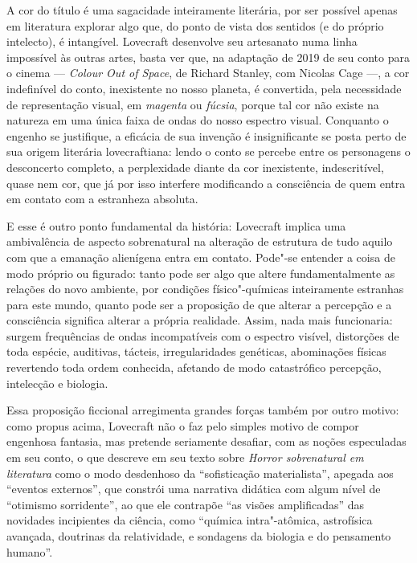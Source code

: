 A cor do título é uma sagacidade inteiramente literária, por ser
possível apenas em literatura explorar algo que, do ponto de vista dos
sentidos (e do próprio intelecto), é intangível. Lovecraft desenvolve
seu artesanato numa linha impossível às outras artes, basta ver que, na
adaptação de 2019 de seu conto para o cinema --- \textit{Colour Out of
Space}, de Richard Stanley, com Nicolas Cage ---, a cor indefinível do
conto, inexistente no nosso planeta, é convertida, pela necessidade de
representação visual, em \textit{magenta} ou \textit{fúcsia}, porque tal cor
não existe na natureza em uma única faixa de ondas do nosso espectro
visual. Conquanto o engenho se justifique, a eficácia de sua invenção é
insignificante se posta perto de sua origem literária lovecraftiana:
lendo o conto se percebe entre os personagens o desconcerto completo, a
perplexidade diante da cor inexistente, indescritível, quase nem cor,
que já por isso interfere modificando a consciência de quem entra em
contato com a estranheza absoluta.

E esse é outro ponto fundamental da história: Lovecraft implica uma
ambivalência de aspecto sobrenatural na alteração de estrutura de tudo
aquilo com que a emanação alienígena entra em contato. Pode"-se entender
a coisa de modo próprio ou figurado: tanto pode ser algo que altere
fundamentalmente as relações do novo ambiente, por condições
físico"-químicas inteiramente estranhas para este mundo, quanto pode ser
a proposição de que alterar a percepção e a consciência significa
alterar a própria realidade. Assim, nada mais funcionaria: surgem
frequências de ondas incompatíveis com o espectro visível, distorções de
toda espécie, auditivas, tácteis, irregularidades genéticas, abominações
físicas revertendo toda ordem conhecida, afetando de modo catastrófico
percepção, intelecção e biologia.

Essa proposição ficcional arregimenta grandes forças também por outro
motivo: como propus acima, Lovecraft não o faz pelo simples motivo de
compor engenhosa fantasia, mas pretende seriamente desafiar, com as
noções especuladas em seu conto, o que descreve em seu texto sobre
\textit{Horror sobrenatural em literatura} como o modo desdenhoso da
``sofisticação materialista'', apegada aos ``eventos externos'', que
constrói uma narrativa didática com algum nível de ``otimismo
sorridente'', ao que ele contrapõe ``as visões amplificadas'' das
novidades incipientes da ciência, como ``química intra"-atômica,
astrofísica avançada, doutrinas da relatividade, e sondagens da biologia
e do pensamento humano''.

